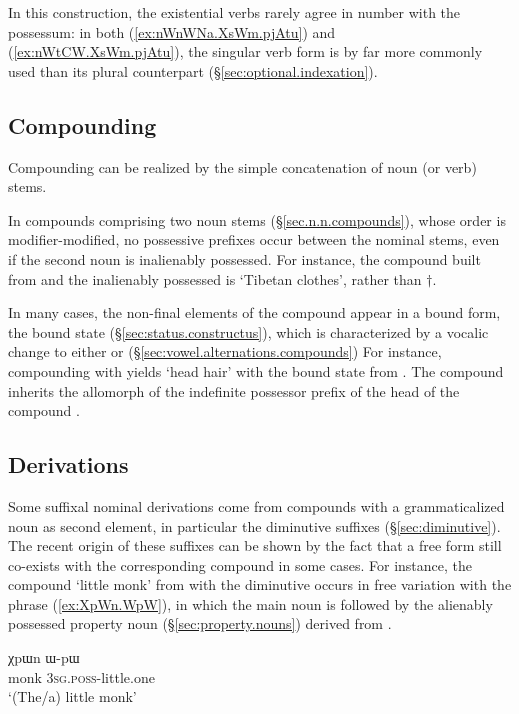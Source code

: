 In this construction, the existential verbs rarely agree in number with the possessum: in both (\ref{ex:nWnWNa.XsWm.pjAtu}) and (\ref{ex:nWtCW.XsWm.pjAtu}), the singular verb form  is by far more commonly used than its plural counterpart (§\ref{sec:optional.indexation}).

\subsection{Compounding}
Compounding can be realized by the simple concatenation of noun (or verb) stems.

In compounds comprising two noun stems (§\ref{sec.n.n.compounds}), whose order is modifier-modified, no possessive prefixes occur between the nominal stems, even if the second noun is inalienably possessed. For instance, the compound built from  and the inalienably possessed  is  `Tibetan clothes', rather than $\dagger$.

In many cases, the non-final elements of the compound appear in a bound form, the bound state (§\ref{sec:status.constructus}), which is characterized by a vocalic change to either  or  (§\ref{sec:vowel.alternations.compounds}) For instance, compounding  with  yields  `head hair' with the bound state  from . The compound inherits the allomorph  of the indefinite possessor prefix of the head of the compound .
 

\subsection{Derivations}
Some suffixal nominal derivations come from compounds with a grammaticalized noun as second element, in particular the diminutive suffixes (§\ref{sec:diminutive}). The recent origin of these suffixes can be shown by the fact that a free form still co-exists with the corresponding compound in some cases. For instance, the compound  `little monk' from  with the diminutive  occurs in free variation with the phrase (\ref{ex:XpWn.WpW}), in which the main noun is followed by the alienably possessed property noun  (§\ref{sec:property.nouns}) derived from .

\begin{exe}
\ex \label{ex:XpWn.WpW}
\gll χpɯn ɯ-pɯ \\
monk \textsc{3sg}.\textsc{poss}-little.one  \\
\glt `(The/a) little monk' 
\end{exe}

